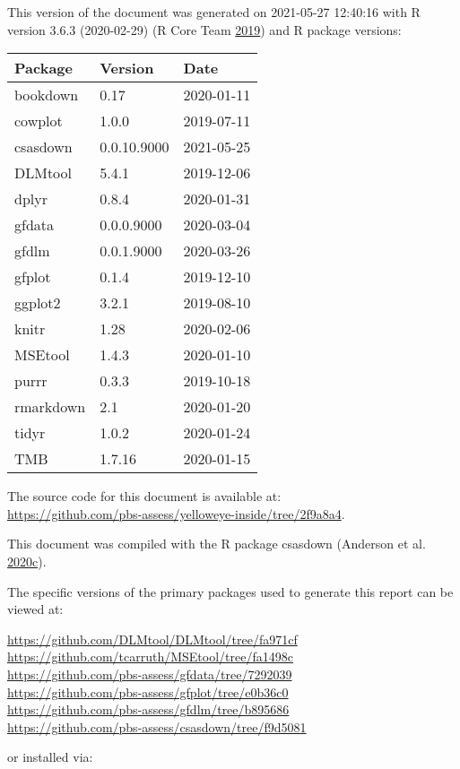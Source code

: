 \documentclass[11pt]{book}
\begin{document}
This version of the document was generated on 2021-05-27 12:40:16 with R version 3.6.3 (2020-02-29) (R Core Team \protect\hyperlink{ref-r2019}{2019}) and R package versions:
\begin{longtable}[]{@{}lll@{}}
\toprule
Package & Version & Date\tabularnewline
\midrule
\endhead
bookdown & 0.17 & 2020-01-11\tabularnewline
cowplot & 1.0.0 & 2019-07-11\tabularnewline
csasdown & 0.0.10.9000 & 2021-05-25\tabularnewline
DLMtool & 5.4.1 & 2019-12-06\tabularnewline
dplyr & 0.8.4 & 2020-01-31\tabularnewline
gfdata & 0.0.0.9000 & 2020-03-04\tabularnewline
gfdlm & 0.0.1.9000 & 2020-03-26\tabularnewline
gfplot & 0.1.4 & 2019-12-10\tabularnewline
ggplot2 & 3.2.1 & 2019-08-10\tabularnewline
knitr & 1.28 & 2020-02-06\tabularnewline
MSEtool & 1.4.3 & 2020-01-10\tabularnewline
purrr & 0.3.3 & 2019-10-18\tabularnewline
rmarkdown & 2.1 & 2020-01-20\tabularnewline
tidyr & 1.0.2 & 2020-01-24\tabularnewline
TMB & 1.7.16 & 2020-01-15\tabularnewline
\bottomrule
\end{longtable}
The source code for this document is available at:\\
\url{https://github.com/pbs-assess/yelloweye-inside/tree/2f9a8a4}.

This document was compiled with the R package csasdown (Anderson et al. \protect\hyperlink{ref-csasdown}{2020}\protect\hyperlink{ref-csasdown}{c}).

The specific versions of the primary packages used to generate this report can be viewed at:

\url{https://github.com/DLMtool/DLMtool/tree/fa971cf}\\
\url{https://github.com/tcarruth/MSEtool/tree/fa1498c}~\\
\url{https://github.com/pbs-assess/gfdata/tree/7292039}~\\
\url{https://github.com/pbs-assess/gfplot/tree/e0b36c0}~\\
\url{https://github.com/pbs-assess/gfdlm/tree/b895686}~\\
\url{https://github.com/pbs-assess/csasdown/tree/f9d5081}~\\

\vspace{4mm}

or installed via:
\end{document}
